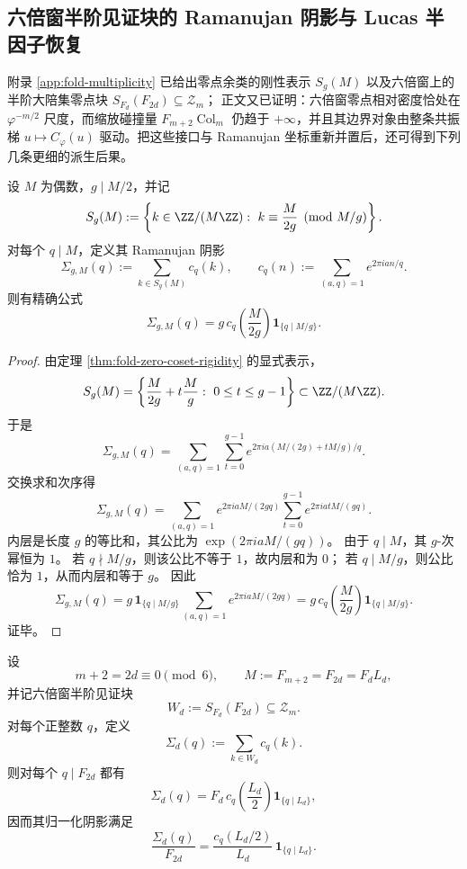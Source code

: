 \subsection{六倍窗半阶见证块的 Ramanujan 阴影与 Lucas 半因子恢复}

附录 \ref{app:fold-multiplicity} 已给出零点余类的刚性表示
\(
S_g(M)
\)
以及六倍窗上的半阶大陪集零点块
\(
S_{F_d}(F_{2d})\subseteq \mathcal Z_m
\)；
正文又已证明：六倍窗零点相对密度恰处在 \(\varphi^{-m/2}\) 尺度，而缩放碰撞量
\(
F_{m+2}\operatorname{Col}_m
\)
仍趋于 \(+\infty\)，并且其边界对象由整条共振梯 \(u\mapsto C_\varphi(u)\) 驱动。把这些接口与 Ramanujan 坐标重新并置后，还可得到下列几条更细的派生后果。

\begin{theorem}\label{thm:derived-single-coset-ramanujan-shadow-closed-form}
设 \(M\) 为偶数，\(g\mid M/2\)，并记
\[
S_g(M):=
\left\{
k\in \ZZ/(M\ZZ):\
k\equiv \frac{M}{2g}\pmod{M/g}
\right\}.
\]
对每个 \(q\mid M\)，定义其 Ramanujan 阴影
\[
\Sigma_{g,M}(q):=\sum_{k\in S_g(M)}c_q(k),
\qquad
c_q(n):=\sum_{(a,q)=1}e^{2\pi i an/q}.
\]
则有精确公式
\[
\boxed{\;
\Sigma_{g,M}(q)
=
g\,c_q\!\left(\frac{M}{2g}\right)\mathbf 1_{\{q\mid M/g\}}.\;}
\]
\end{theorem}

\begin{proof}
由定理 \ref{thm:fold-zero-coset-rigidity} 的显式表示，
\[
S_g(M)=
\left\{
\frac{M}{2g}+t\frac{M}{g}:\ 0\le t\le g-1
\right\}\subset \ZZ/(M\ZZ).
\]
于是
\[
\Sigma_{g,M}(q)
=
\sum_{(a,q)=1}
\sum_{t=0}^{g-1}
e^{2\pi i a(M/(2g)+tM/g)/q}.
\]
交换求和次序得
\[
\Sigma_{g,M}(q)
=
\sum_{(a,q)=1}
e^{2\pi i aM/(2gq)}
\sum_{t=0}^{g-1}e^{2\pi i atM/(gq)}.
\]
内层是长度 \(g\) 的等比和，其公比为
\(
\exp(2\pi i aM/(gq))
\)。
由于 \(q\mid M\)，其 \(g\)-次幂恒为 \(1\)。
若 \(q\nmid M/g\)，则该公比不等于 \(1\)，故内层和为 \(0\)；
若 \(q\mid M/g\)，则公比恰为 \(1\)，从而内层和等于 \(g\)。
因此
\[
\Sigma_{g,M}(q)
=
g\,\mathbf 1_{\{q\mid M/g\}}
\sum_{(a,q)=1}e^{2\pi i aM/(2gq)}
=
g\,c_q\!\left(\frac{M}{2g}\right)\mathbf 1_{\{q\mid M/g\}}.
\]
证毕。
\end{proof}

\begin{theorem}\label{thm:derived-window6-halfblock-lucas-ramanujan-factorization}
设
\[
m+2=2d\equiv 0\pmod 6,
\qquad
M:=F_{m+2}=F_{2d}=F_dL_d,
\]
并记六倍窗半阶见证块
\[
W_d:=S_{F_d}(F_{2d})\subseteq \mathcal Z_m.
\]
对每个正整数 \(q\)，定义
\[
\Sigma_d(q):=\sum_{k\in W_d}c_q(k).
\]
则对每个 \(q\mid F_{2d}\) 都有
\[
\boxed{\;
\Sigma_d(q)
=
F_d\,c_q\!\left(\frac{L_d}{2}\right)\mathbf 1_{\{q\mid L_d\}},\;}
\]
因而其归一化阴影满足
\[
\boxed{\;
\frac{\Sigma_d(q)}{F_{2d}}
=
\frac{c_q(L_d/2)}{L_d}\,\mathbf 1_{\{q\mid L_d\}}.\;}
\]
\end{theorem}

